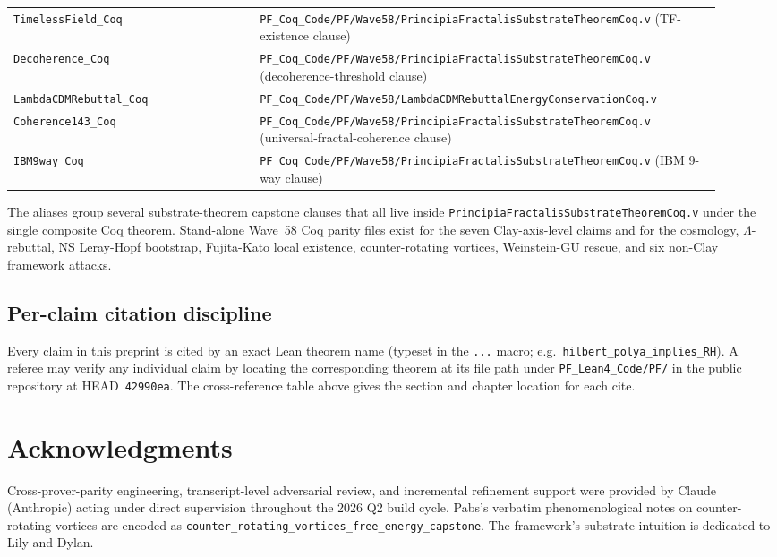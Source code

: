 \documentclass[11pt,a4paper]{article}
\theoremstyle{definition}
\theoremstyle{remark}
\newcommand{\lean}[1]{\texttt{\small #1}}
\begin{document}
\begin{longtable}{p{0.32\linewidth} p{0.60\linewidth}}
\lean{TimelessField\_Coq} & \texttt{PF\_Coq\_Code/PF/Wave58/PrincipiaFractalisSubstrateTheoremCoq.v} (TF-existence clause) \\
\lean{Decoherence\_Coq} & \texttt{PF\_Coq\_Code/PF/Wave58/PrincipiaFractalisSubstrateTheoremCoq.v} (decoherence-threshold clause) \\
\lean{LambdaCDMRebuttal\_Coq} & \texttt{PF\_Coq\_Code/PF/Wave58/LambdaCDMRebuttalEnergyConservationCoq.v} \\
\lean{Coherence143\_Coq} & \texttt{PF\_Coq\_Code/PF/Wave58/PrincipiaFractalisSubstrateTheoremCoq.v} (universal-fractal-coherence clause) \\
\lean{IBM9way\_Coq} & \texttt{PF\_Coq\_Code/PF/Wave58/PrincipiaFractalisSubstrateTheoremCoq.v} (IBM 9-way clause) \\
\bottomrule
\end{longtable}

The aliases group several substrate-theorem capstone clauses that
all live inside \texttt{PrincipiaFractalisSubstrateTheoremCoq.v}
under the single composite Coq theorem. Stand-alone Wave~58 Coq
parity files exist for the seven Clay-axis-level claims and for
the cosmology, $\Lambda$-rebuttal, NS Leray-Hopf bootstrap,
Fujita-Kato local existence, counter-rotating vortices,
Weinstein-GU rescue, and six non-Clay framework attacks.

\subsection{Per-claim citation discipline}

Every claim in this preprint is cited by an exact Lean theorem
name (typeset in the \lean{...} macro; e.g.\
\lean{hilbert\_polya\_implies\_RH}). A referee may verify any
individual claim by locating the corresponding theorem at its
file path under \lean{PF\_Lean4\_Code/PF/} in the public
repository at HEAD~\texttt{42990ea}. The cross-reference table
above gives the section and chapter location for each cite.

\section*{Acknowledgments}

Cross-prover-parity engineering, transcript-level adversarial
review, and incremental refinement support were provided by
Claude (Anthropic) acting under direct supervision throughout
the 2026 Q2 build cycle. Pabs's verbatim phenomenological notes
on counter-rotating vortices are encoded as
\lean{counter\_rotating\_vortices\_free\_energy\_capstone}. The
framework's substrate intuition is dedicated to Lily and Dylan.
\end{document}
